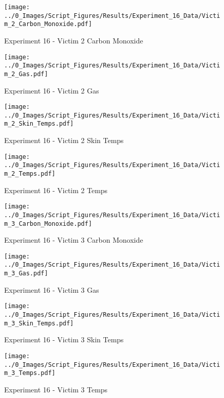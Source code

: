 	\clearpage

	\begin{figure}[H]
		\centering
		\texttt{[image: ../0\_Images/Script\_Figures/Results/Experiment\_16\_Data/Victim\_2\_Carbon\_Monoxide.pdf]}
		\caption[]{Experiment 16 - Victim 2 Carbon Monoxide}
	\end{figure}
 

	\begin{figure}[H]
		\centering
		\texttt{[image: ../0\_Images/Script\_Figures/Results/Experiment\_16\_Data/Victim\_2\_Gas.pdf]}
		\caption[]{Experiment 16 - Victim 2 Gas}
	\end{figure}
 
	\clearpage

	\begin{figure}[H]
		\centering
		\texttt{[image: ../0\_Images/Script\_Figures/Results/Experiment\_16\_Data/Victim\_2\_Skin\_Temps.pdf]}
		\caption[]{Experiment 16 - Victim 2 Skin Temps}
	\end{figure}
 

	\begin{figure}[H]
		\centering
		\texttt{[image: ../0\_Images/Script\_Figures/Results/Experiment\_16\_Data/Victim\_2\_Temps.pdf]}
		\caption[]{Experiment 16 - Victim 2 Temps}
	\end{figure}
 
	\clearpage

	\begin{figure}[H]
		\centering
		\texttt{[image: ../0\_Images/Script\_Figures/Results/Experiment\_16\_Data/Victim\_3\_Carbon\_Monoxide.pdf]}
		\caption[]{Experiment 16 - Victim 3 Carbon Monoxide}
	\end{figure}
 

	\begin{figure}[H]
		\centering
		\texttt{[image: ../0\_Images/Script\_Figures/Results/Experiment\_16\_Data/Victim\_3\_Gas.pdf]}
		\caption[]{Experiment 16 - Victim 3 Gas}
	\end{figure}
 
	\clearpage

	\begin{figure}[H]
		\centering
		\texttt{[image: ../0\_Images/Script\_Figures/Results/Experiment\_16\_Data/Victim\_3\_Skin\_Temps.pdf]}
		\caption[]{Experiment 16 - Victim 3 Skin Temps}
	\end{figure}
 

	\begin{figure}[H]
		\centering
		\texttt{[image: ../0\_Images/Script\_Figures/Results/Experiment\_16\_Data/Victim\_3\_Temps.pdf]}
		\caption[]{Experiment 16 - Victim 3 Temps}
	\end{figure}
 
